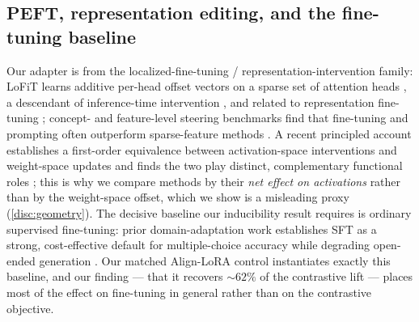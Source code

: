 \subsection{PEFT, representation editing, and the fine-tuning baseline}
\label{related:peft}

Our adapter is from the localized-fine-tuning / representation-intervention family:
LoFiT learns additive per-head offset vectors on a sparse set of attention heads
\citep{LoFiT}, a descendant of inference-time intervention \citep{ITI}, and related
to representation fine-tuning \citep{ReFT}; concept- and feature-level steering
benchmarks find that fine-tuning and prompting often outperform sparse-feature
methods \citep{AxBench}. A recent principled account establishes a first-order
equivalence between activation-space interventions and weight-space updates and finds
the two play distinct, complementary functional roles
\citep{WeightUpdatesActivationShifts}; this is why we compare methods by their
\emph{net effect on activations} rather than by the weight-space offset, which we show
is a misleading proxy (\cref{disc:geometry}). The decisive baseline our inducibility
result requires is
ordinary supervised fine-tuning: prior domain-adaptation work establishes SFT as a
strong, cost-effective default for multiple-choice accuracy while degrading
open-ended generation \citep{FrenchQASFT}. Our matched Align-LoRA control
instantiates exactly this baseline, and our finding --- that it recovers
${\sim}62\%$ of the contrastive lift --- places most of the effect on fine-tuning in
general rather than on the contrastive objective.
